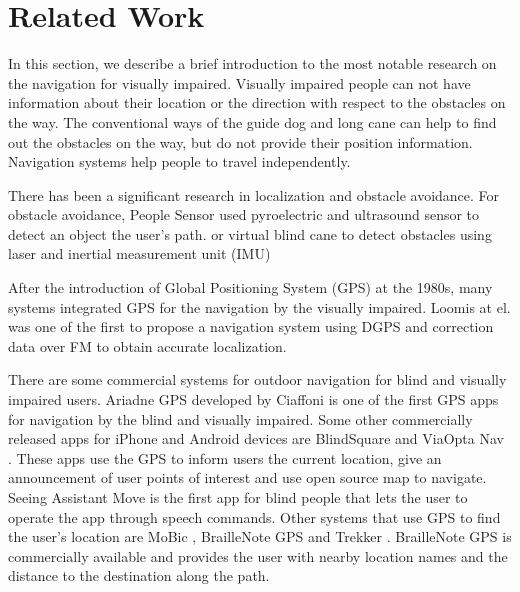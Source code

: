 \chapter{Related Work}
\label{c:relw}

In this section, we describe a brief introduction to the most notable research on the navigation for visually impaired.
Visually impaired people can not have information about their location or the direction with respect to the obstacles on the way.
The conventional ways of the guide dog and long cane can help to find out the obstacles on the way, but do not provide their position information.
Navigation systems help people to travel independently.

There has been a significant research \cite{survey} in localization and obstacle avoidance.
For obstacle avoidance, People Sensor \cite{peoplesensor} used pyroelectric and ultrasound sensor to detect an object the user's path.
or virtual blind cane to detect obstacles using laser and inertial measurement unit (IMU) \cite {virtual}

After the introduction of Global Positioning System (GPS) at the 1980s, many systems integrated GPS for the navigation by the visually impaired.
Loomis at el. \cite{loomis1,loomis,loomis2} was one of the first to propose a navigation system using DGPS and correction data over FM to obtain accurate localization.

There are some commercial systems for outdoor navigation for blind and visually impaired users.
Ariadne GPS \cite{arigps} developed by Ciaffoni is one of the first GPS apps for navigation by the blind and visually impaired.
Some other commercially released apps for iPhone and Android devices are BlindSquare \cite{blindsq} and ViaOpta Nav \cite{viaopta}.
These apps use the GPS to inform users the current location, give an announcement of user points of interest and use open source map to navigate.
Seeing Assistant Move \cite{seeing} is the first app for blind people that lets the user to operate the app through speech commands.
Other systems that use GPS to find the user’s location are MoBic \cite{mobic}, BrailleNote GPS and Trekker \cite{human}. 
BrailleNote GPS is commercially available and provides the user with nearby location names and the distance to the destination along the path. 

